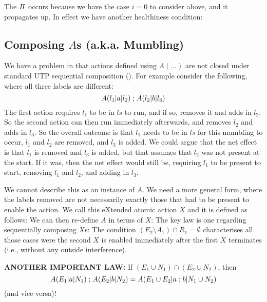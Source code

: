 The $I\!I$ occurs because we have the case $i=0$ to consider above,
and it propagates up.
In effect we have another healthiness condition:





\subsection{Composing $A$s (a.k.a. Mumbling)}\label{ssec:comp-A}

We have a problem in that actions defined using $A(\dots)$
are not closed under standard UTP sequential composition ().
For example consider the following,
where all three labels are different:
\[
   A(l_1|a|l_2) \mathrel{;} A(l_2|b|l_3)
\]
The first action requires $l_1$ to be in $ls$ to run,
and if so, removes it and adds in $l_2$.
So the second action can then run immediately afterwards,
and removes $l_2$ and adds in $l_3$.
So the overall outcome is that $l_1$ needs to be in $ls$
for this mumbling to occur, $l_1$ and $l_2$ are removed,
and $l_3$ is added.
We could argue that the net effect is that $l_1$
is removed and $l_3$ is added,
but that assumes that $l_2$ was not present at the start.
If it was, then the net effect would still be,
requiring $l_1$ to be present to start,
removing $l_1$ and $l_2$, and adding in $l_3$.

We cannot describe this as an instance of $A$.
We need a more general form,
where the labels removed are not necessarily
exactly those that had to be present to enable the action.
We call this eXtended atomic action $X$ and it is defined as follows:
We can then re-define $A$ in terms of $X$:
The key law is one regarding sequentially composing $X$s:
The condition $(E_2\setminus A_1) \cap R_1 = \emptyset$
characterises all those cases were the second $X$ is enabled
immediately after the first $X$ terminates
(i.e., without any outside interference).

\textbf{ANOTHER IMPORTANT LAW:}
If $(E_1 \cup N_1) \cap (E_2 \cup N_2)$, then
\[
  A(E_1|a|N_1) \mathrel{;} A(E_2|b|N_2)
  =
  A(E_1\cup E_2|a\mathrel{;} b|N_1\cup N_2)
\]
(and vice-versa)!


